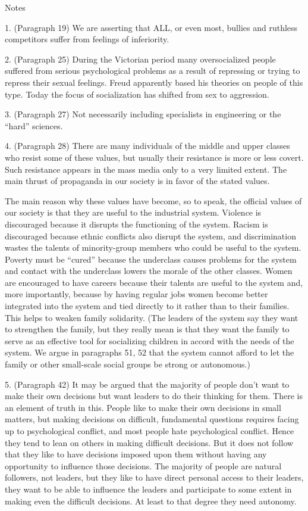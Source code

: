 Notes

1. (Paragraph 19) We are asserting that ALL, or even most, bullies and ruthless competitors suffer from feelings of inferiority.

2. (Paragraph 25) During the Victorian period many oversocialized people suffered from serious psychological problems as a result of repressing or trying to repress their sexual feelings. Freud apparently based his theories on people of this type. Today the focus of socialization has shifted from sex to aggression.

3. (Paragraph 27) Not necessarily including specialists in engineering or the “hard” sciences.

4. (Paragraph 28) There are many individuals of the middle and upper classes who resist some of these values, but usually their resistance is more or less covert. Such resistance appears in the mass media only to a very limited extent. The main thrust of propaganda in our society is in favor of the stated values.

The main reason why these values have become, so to speak, the official values of our society is that they are useful to the industrial system. Violence is discouraged because it disrupts the functioning of the system. Racism is discouraged because ethnic conflicts also disrupt the system, and discrimination wastes the talents of minority-group members who could be useful to the system. Poverty must be “cured” because the underclass causes problems for the system and contact with the underclass lowers the morale of the other classes. Women are encouraged to have careers because their talents are useful to the system and, more importantly, because by having regular jobs women become better integrated into the system and tied directly to it rather than to their families. This helps to weaken family solidarity. (The leaders of the system say they want to strengthen the family, but they really mean is that they want the family to serve as an effective tool for socializing children in accord with the needs of the system. We argue in paragraphs 51, 52 that the system cannot afford to let the family or other small-scale social groups be strong or autonomous.)

5. (Paragraph 42) It may be argued that the majority of people don’t want to make their own decisions but want leaders to do their thinking for them. There is an element of truth in this. People like to make their own decisions in small matters, but making decisions on difficult, fundamental questions requires facing up to psychological conflict, and most people hate psychological conflict. Hence they tend to lean on others in making difficult decisions. But it does not follow that they like to have decisions imposed upon them without having any opportunity to influence those decisions. The majority of people are natural followers, not leaders, but they like to have direct personal access to their leaders, they want to be able to influence the leaders and participate to some extent in making even the difficult decisions. At least to that degree they need autonomy.

